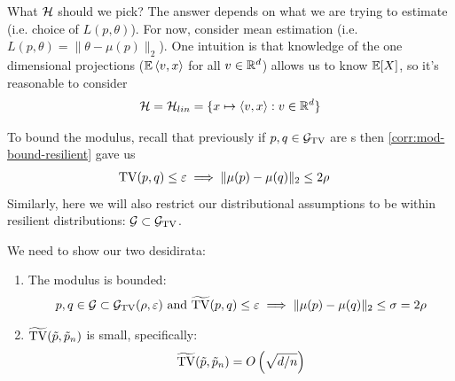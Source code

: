 What $\mathcal{H}$ should we pick? The answer depends on what we are trying to estimate
(i.e. choice of $L(p, \theta)$). For now, consider mean estimation
(i.e. $L(p,\theta) = \|\theta - \mu(p)\|_2$).
One intuition is that knowledge of the one dimensional
projections ($\mathbb{E}\braket{v,x}$ for all $v \in \mathbb{R}^d$) allows us to know
$\mathbb{E}[X]$, so it's reasonable to consider
\begin{align}
    \mathcal{H} = \mathcal{H}_{lin} = \{ x \mapsto \braket{v, x} : v \in \mathbb{R}^d \}
\end{align}

To bound the modulus, recall that previously if $p, q \in \mathcal{G}_{\operatorname{TV}}$ are
s then \cref{corr:mod-bound-resilient} gave us
\begin{align}
    \operatorname{TV}(p, q) \leq \varepsilon &\implies \|\mu(p) - \mu(q)\|_2 \leq 2 \rho
\end{align}
Similarly, here we will also restrict our distributional assumptions to
be within resilient distributions: $\mathcal{G} \subset \mathcal{G}_{\operatorname{TV}}$.

We need to show our two desidirata:
\begin{enumerate}
    \item The modulus is bounded:
    \begin{align}
        p,q \in \mathcal{G} \subset \mathcal{G}_{\operatorname{TV}}(\rho, \varepsilon)
        \text{ and } \widetilde{\operatorname{TV}}(p,q) \leq \varepsilon
        \implies \|\mu(p) - \mu(q)\|_2 \leq \sigma = 2 \rho\label{eq:9-12-desidirata-1}
    \end{align}
    \item $\widetilde{\operatorname{TV}}(\tilde{p}, \tilde{p}_n)$ is small, specifically:
    \begin{align}
        \widetilde{\operatorname{TV}}(\tilde{p}, \tilde{p}_n) = O\left(\sqrt{d/n}\right)\label{eq:9-12-desidirata-2}
    \end{align}
\end{enumerate}

